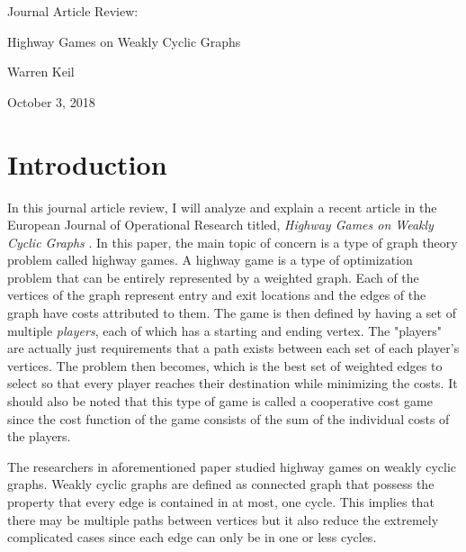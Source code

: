 \documentclass{article}
\begin{document}
\setlength{\parindent}{8mm}   %


\text{ } 
\vspace{15mm} 

\thispagestyle{empty}

{\huge
 \centerline{Journal Article Review: }
 \centerline{Highway Games on Weakly Cyclic Graphs}
\centerline{Warren Keil } 
\centerline{October 3, 2018} 
}

\vspace{39mm}






\section{Introduction} 

 In this journal article review, I will analyze and explain a recent article in the European Journal of Operational Research titled, \textit{Highway Games on Weakly Cyclic Graphs} \cite{high}. In this paper, the main topic of concern is a type of graph theory problem called highway games. A highway game is a type of optimization problem that can be entirely represented by a weighted graph. Each of the vertices of the graph represent entry and exit locations and the edges of the graph have costs attributed to them. The game is then defined by having a set of multiple \textit{players}, each of which has a starting and ending vertex. The "players" are actually just requirements that a path exists between each set of each player's vertices. The problem then becomes, which is the best set of weighted edges to select so that every player reaches their destination while minimizing the costs. It should also be noted that this type of game is called a cooperative cost game since the cost function of the game consists of the sum of the individual costs of the players.
 
 The researchers in aforementioned paper \cite{high} studied highway games on weakly cyclic graphs. Weakly cyclic graphs are defined as connected graph that possess the property that every edge is contained in at most, one cycle. This implies that there may be multiple paths between vertices but it also reduce the extremely complicated cases since each edge can only be in one or less cycles.
 
\end{document}
